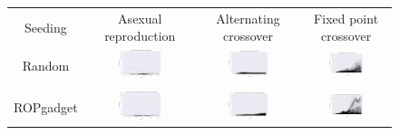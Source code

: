 \documentclass{article}
\begin{document}
\begin{landscape}
\begin{figure}[t]
\begin{center}
\begin{tabular}{c c c c}
    Seeding & Asexual reproduction & Alternating crossover & Fixed point crossover \\
    Random & \includegraphics[align=c,width=0.42\textwidth]{ac/e2/1} & \includegraphics[align=c,width=0.42\textwidth]{ac/e2/2} & \includegraphics[align=c,width=0.42\textwidth]{ac/e2/3} \\
    & & & \\
    ROPgadget & \includegraphics[align=c,width=0.42\textwidth]{ac/e2/4} & \includegraphics[align=c,width=0.42\textwidth]{ac/e2/5} & \includegraphics[align=c,width=0.42\textwidth]{ac/e2/6} \\

\end{tabular}
\end{center}
\end{figure}
\end{landscape}
\end{document}
